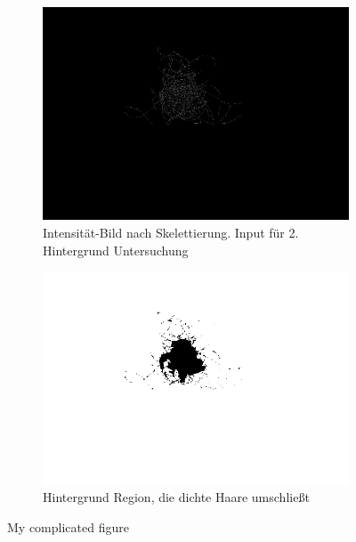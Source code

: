 \documentclass[german,a4paper, 12pt]{llncs}
\begin{document}
\begin{figure}[H]
	\medskip
	\begin{subfigure}{0.48\textwidth}
		\includegraphics[width=\linewidth]{figBina/09input intensity.png}
		\caption{Intensität-Bild nach Skelettierung. Input für 2. Hintergrund Untersuchung} \label{fig:e}
	\end{subfigure}\hspace*{\fill}
	\begin{subfigure}{0.48\textwidth}
		\includegraphics[width=\linewidth]{figBina/09outer section.png}
		\caption{Hintergrund Region, die dichte Haare umschließt} \label{fig:f}
	\end{subfigure}
	
	
	\caption{My complicated figure} \label{fig:1}
\end{figure}
\end{document}
